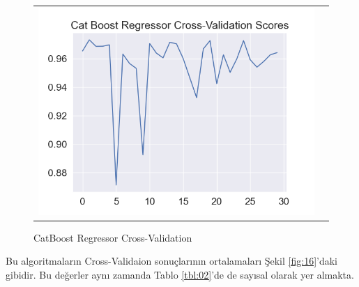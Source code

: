 \documentclass[conference]{IEEEtran}
\begin{document}
\begin{figure}[!h]
	\centering
	\begin{center}
		\begin{tabular}{cc}
			\includegraphics[scale=0.5]{pictures/pic_15.png}&
		\end{tabular}
	\end{center}
	\caption{CatBoost Regressor Cross-Validation}
	\label{fig:15}
\end{figure}

\quad Bu algoritmaların Cross-Validaion sonuçlarının ortalamaları Şekil \ref{fig:16}'daki gibidir. Bu değerler aynı zamanda Tablo \ref{tbl:02}'de de sayısal olarak yer almakta.
\end{document}

